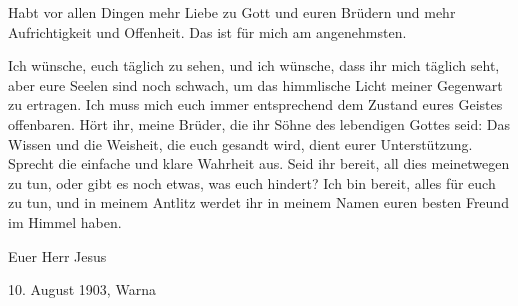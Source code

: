 Habt vor allen Dingen mehr Liebe zu Gott und euren Brüdern und mehr Aufrichtigkeit und Offenheit. Das ist für mich am angenehmsten. 

Ich wünsche, euch täglich zu sehen, und ich wünsche, dass ihr mich täglich seht, aber eure Seelen sind noch schwach, um das himmlische Licht meiner Gegenwart zu ertragen. Ich muss mich euch immer entsprechend dem Zustand eures Geistes offenbaren. Hört ihr, meine Brüder, die ihr Söhne des lebendigen Gottes seid: Das Wissen und die Weisheit, die euch gesandt wird, dient eurer Unterstützung. Sprecht die einfache und klare Wahrheit aus. Seid ihr bereit, all dies meinetwegen zu tun, oder gibt es noch etwas, was euch hindert? Ich bin bereit, alles für euch zu tun, und in meinem Antlitz werdet ihr in meinem Namen euren besten Freund im Himmel haben.


Euer Herr Jesus

10. August 1903, Warna

